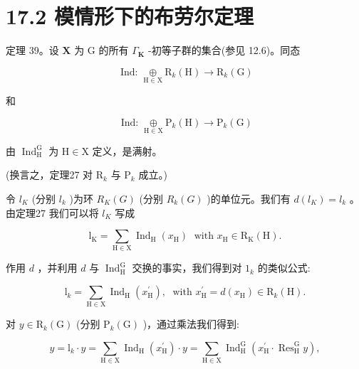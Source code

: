 \documentclass[10pt]{article}
\begin{document}
\section*{17.2 模情形下的布劳尔定理}

定理 39。设 \(\mathbf{X}\) 为 \(\mathrm{G}\) 的所有 \({\Gamma }_{\mathbf{K}}\) -初等子群的集合(参见 12.6)。同态

\[
\text{ Ind: }\mathop{\oplus }\limits_{{\mathrm{H} \in  \mathrm{X}}}{\mathrm{R}}_{k}\left( \mathrm{H}\right)  \rightarrow  {\mathrm{R}}_{k}\left( \mathrm{G}\right)
\]

和

\[
\text{ Ind: }\mathop{\oplus }\limits_{{\mathrm{H} \in  \mathrm{X}}}{\mathrm{P}}_{k}\left( \mathrm{H}\right)  \rightarrow  {\mathrm{P}}_{k}\left( \mathrm{G}\right)
\]

由 \({\operatorname{Ind}}_{\mathrm{H}}^{\mathrm{G}}\) 为 \(\mathrm{H} \in  \mathrm{X}\) 定义，是满射。

(换言之，定理27 对 \({\mathrm{R}}_{k}\) 与 \({\mathrm{P}}_{k}\) 成立。)

令 \({l}_{K}\) (分别 \({l}_{k}\) )为环 \({R}_{K}\left( G\right)\) (分别 \({R}_{k}\left( G\right)\) )的单位元。我们有 \(d\left( {l}_{K}\right)  = {l}_{k}\) 。由定理27 我们可以将 \({l}_{K}\) 写成

\[
{\mathrm{l}}_{\mathrm{K}} = \mathop{\sum }\limits_{{\mathrm{H} \in  \mathrm{X}}}{\operatorname{Ind}}_{\mathrm{H}}\left( {x}_{\mathrm{H}}\right) \;\text{ with }{x}_{\mathrm{H}} \in  {\mathrm{R}}_{\mathrm{K}}\left( \mathrm{H}\right) .
\]

作用 \(d\) ，并利用 \(d\) 与 \({\operatorname{Ind}}_{\mathrm{H}}^{\mathrm{G}}\) 交换的事实，我们得到对 \({1}_{k}\) 的类似公式:

\[
{\mathrm{l}}_{k} = \mathop{\sum }\limits_{{\mathrm{H} \in  \mathrm{X}}}{\operatorname{Ind}}_{\mathrm{H}}\left( {x}_{\mathrm{H}}^{\prime }\right) ,\;\text{ with }{x}_{\mathrm{H}}^{\prime } = d\left( {x}_{\mathrm{H}}\right)  \in  {\mathrm{R}}_{k}\left( \mathrm{H}\right) .
\]

对 \(y \in  {\mathrm{R}}_{k}\left( \mathrm{G}\right)\) (分别 \({\mathrm{P}}_{k}\left( \mathrm{G}\right)\) )，通过乘法我们得到:

\[
y = {\mathrm{l}}_{k} \cdot  y = \mathop{\sum }\limits_{{\mathrm{H} \in  \mathrm{X}}}{\operatorname{Ind}}_{\mathrm{H}}\left( {x}_{\mathrm{H}}^{\prime }\right)  \cdot  y = \mathop{\sum }\limits_{{\mathrm{H} \in  \mathrm{X}}}{\operatorname{Ind}}_{\mathrm{H}}^{\mathrm{G}}\left( {{x}_{\mathrm{H}}^{\prime } \cdot  {\operatorname{Res}}_{\mathrm{H}}^{\mathrm{G}}y}\right) ,
\]
\end{document}
